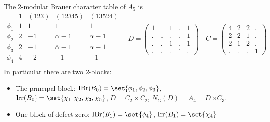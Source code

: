 \documentclass[fontsize=11pt,fleqn,a4paper]{scrartcl}
\begin{document}
\begin{theorem}
The $2$-modular Brauer character table of $A_5$ is
\[\begin{array}{c|cccc}
 & 1 & (123) & (12345) & (13524) \\
 \hline\hline
\phi_1 & 1 & 1 & 1 & 1 \\
\phi_2 & 2 & -1 & \alpha-1 & \overline{\alpha}-1 \\
\phi_3 & 2 & -1 & \overline{\alpha}-1 & \alpha-1 \\
\phi_4 & 4 & -2 & -1 & -1 \\
\end{array}
\quad
D=\begin{pmatrix}
1 & 1 & 1 & . & 1 \\
. & 1 & . & . & 1 \\
. & . & 1 & . & 1 \\
. & . & . & 1 & .
\end{pmatrix}
\quad
C=\begin{pmatrix}
4 & 2 & 2 & . \\
2 & 2 & 1 & . \\
2 & 1 & 2 & . \\
. & . & . & 1
\end{pmatrix}\]
In particular there are two $2$-blocks:
\begin{itemize}
\item The principal block:
$\IBr(B_0)=\set{\phi_1,\phi_2,\phi_3}$,
$\Irr(B_0)=\set{\chi_1,\chi_2,\chi_3,\chi_5}$,
$D=C_2\times C_2$, $N_G(D) = A_4=D\rtimes C_3$.
\item One block of defect zero:
$\IBr(B_1)=\set{\phi_4}$,
$\Irr(B_1)=\set{\chi_4}$
\end{itemize}
\end{theorem}
\end{document}
